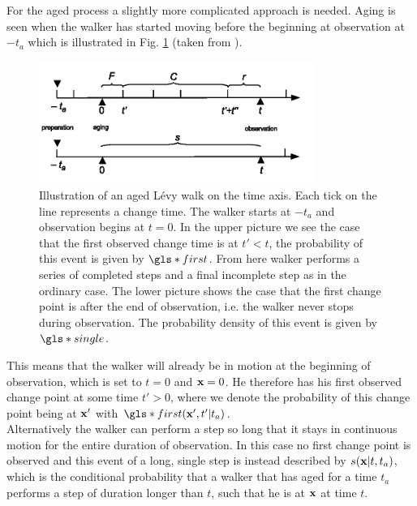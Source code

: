 For the aged process a slightly more complicated approach is needed. Aging is seen when the walker has started moving before the beginning at observation at $-t_a$ which is illustrated in Fig. \ref{fig:pdfAged} (taken from 
\cite{bothe}). 
%
\begin{figure}
\begin{center}
\includegraphics[width=90mm]{pics/timelineAged.png}
\caption{Illustration of an aged L\'evy walk on the time axis. Each tick on the line represents a change time. The walker starts at $-t_a$ and observation begins at $t=0$.  In the upper picture we see the case that the first observed change time is at $t'<t$, the probability of this event is given by $\gls*{first}$. From here walker performs a series of completed steps and a final incomplete step as in the ordinary case. The lower picture shows the case that the first change point is after the end of observation, i.e. the walker never stops during observation. The probability density of this event is given by $\gls*{single}$.
\label{fig:pdfAged}}
\end{center}
\end{figure}
%
This means that the walker will already be in motion at the beginning of observation, which is set to $t=0$ and $\mathbf{ x }=0$. He therefore has his first observed change point at some time $t'>0$, where we denote the probability of this change point being at $\mathbf{ x' }$ with $\gls*{first}(\ve{x}',t'|t_a)$. \\
Alternatively the walker can perform a step so long that it stays in continuous motion for the entire duration of observation. In this case no first change point is observed and this event of a long, single step is instead described by $s(\mathbf{ x }|t,t_a)$, which is the conditional probability that a walker that has aged for a time $t_a$ performs a step of duration longer than $t$, such that he is at $\mathbf{ x }$ at time $t$. 


